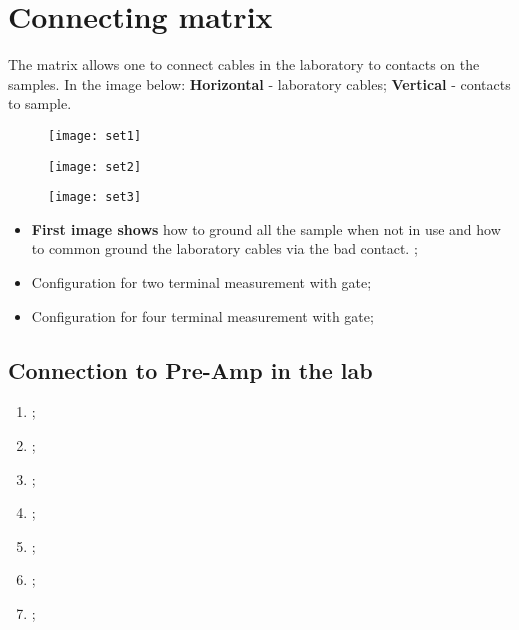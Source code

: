  \section{Connecting matrix}
The matrix allows one to connect cables in the laboratory to contacts on the samples. In the image below: \textbf{Horizontal} - laboratory cables; \textbf{Vertical} - contacts to sample.


\begin{figure}[h]
	\centering
	\begin{minipage}{0.4\linewidth}
		\texttt{[image: set1]}
	\end{minipage}
	\begin{minipage}{0.4\linewidth}
		\texttt{[image: set2]}
	\end{minipage}
	\begin{minipage}{0.4\linewidth}
		\texttt{[image: set3]}
	\end{minipage}
\end{figure}
\begin{itemize}
	\item \textbf{First image shows} how to ground all the sample when not in use and how to common ground the laboratory cables via the bad contact. ;
	\item Configuration for two terminal measurement with gate;
	\item Configuration for four terminal measurement with gate;
\end{itemize}

\subsection{Connection to Pre-Amp in the lab}
\begin{enumerate}
	\item {};
	\item {};
	\item {};
	\item {};
	\item {};
	\item {};
	\item {};
\end{enumerate}


\newpage

  
 